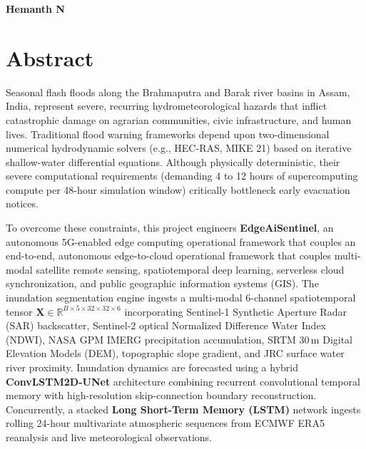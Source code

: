 \documentclass[12pt,a4paper,oneside]{report}
\begin{document}
\vspace{1.5cm}
\noindent
\textbf{Hemanth N}

\newpage
\chapter*{Abstract}
\thispagestyle{plain}

Seasonal flash floods along the Brahmaputra and Barak river basins in Assam, India, represent severe, recurring hydrometeorological hazards that inflict catastrophic damage on agrarian communities, civic infrastructure, and human lives. Traditional flood warning frameworks depend upon two-dimensional numerical hydrodynamic solvers (e.g., HEC-RAS, MIKE 21) based on iterative shallow-water differential equations. Although physically deterministic, their severe computational requirements (demanding 4 to 12 hours of supercomputing compute per 48-hour simulation window) critically bottleneck early evacuation notices.

To overcome these constraints, this project engineers \textbf{EdgeAiSentinel}, an autonomous 5G-enabled edge computing operational framework that couples an end-to-end, autonomous edge-to-cloud operational framework that couples multi-modal satellite remote sensing, spatiotemporal deep learning, serverless cloud synchronization, and public geographic information systems (GIS). The inundation segmentation engine ingests a multi-modal 6-channel spatiotemporal tensor $\mathbf{X} \in \mathbb{R}^{B \times 5 \times 32 \times 32 \times 6}$ incorporating Sentinel-1 Synthetic Aperture Radar (SAR) backscatter, Sentinel-2 optical Normalized Difference Water Index (NDWI), NASA GPM IMERG precipitation accumulation, SRTM 30\,m Digital Elevation Models (DEM), topographic slope gradient, and JRC surface water river proximity. Inundation dynamics are forecasted using a hybrid \textbf{ConvLSTM2D-UNet} architecture combining recurrent convolutional temporal memory with high-resolution skip-connection boundary reconstruction. Concurrently, a stacked \textbf{Long Short-Term Memory (LSTM)} network ingests rolling 24-hour multivariate atmospheric sequences from ECMWF ERA5 reanalysis and live meteorological observations.
\end{document}
